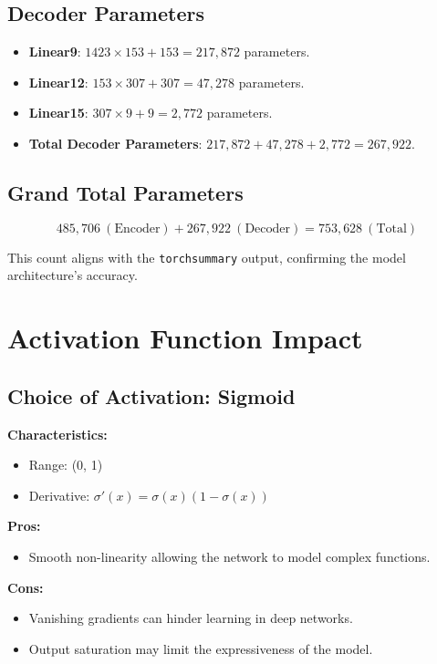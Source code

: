 \documentclass[10pt]{article}
\begin{document}
\subsection{Decoder Parameters}
\begin{itemize}
    \item \textbf{Linear9}: \( 1423 \times 153 + 153 = 217,872 \) parameters.
    \item \textbf{Linear12}: \( 153 \times 307 + 307 = 47,278 \) parameters.
    \item \textbf{Linear15}: \( 307 \times 9 + 9 = 2,772 \) parameters.
    \item \textbf{Total Decoder Parameters}: \( 217,872 + 47,278 + 2,772 = 267,922 \).
\end{itemize}

\subsection{Grand Total Parameters}
\[
485,706 \ (\text{Encoder}) + 267,922 \ (\text{Decoder}) = 753,628 \ (\text{Total})
\]

This count aligns with the \texttt{torchsummary} output, confirming the model architecture's accuracy.

\section{Activation Function Impact}

\subsection{Choice of Activation: Sigmoid}
\textbf{Characteristics:}
\begin{itemize}
    \item Range: (0, 1)
    \item Derivative: \( \sigma'(x) = \sigma(x)(1 - \sigma(x)) \)
\end{itemize}

\textbf{Pros:}
\begin{itemize}
    \item Smooth non-linearity allowing the network to model complex functions.
\end{itemize}

\textbf{Cons:}
\begin{itemize}
    \item Vanishing gradients can hinder learning in deep networks.
    \item Output saturation may limit the expressiveness of the model.
\end{itemize}
\end{document}
